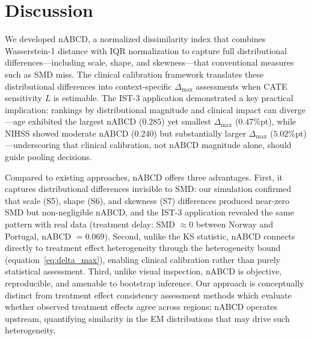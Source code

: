 \documentclass[AMA,Times1COL]{WileyNJDv5}
\begin{document}
\section{Discussion}\label{sec:discussion}

We developed nABCD, a normalized dissimilarity index that combines Wasserstein-1 distance with IQR normalization to capture full distributional differences---including scale, shape, and skewness---that conventional measures such as SMD miss. The clinical calibration framework translates these distributional differences into context-specific $\Delta_{\max}$ assessments when CATE sensitivity $L$ is estimable. The IST-3 application demonstrated a key practical implication: rankings by distributional magnitude and clinical impact can diverge---age exhibited the largest nABCD ($0.285$) yet smallest $\Delta_{\max}$ ($0.47$\%pt), while NIHSS showed moderate nABCD ($0.240$) but substantially larger $\Delta_{\max}$ ($5.02$\%pt)---underscoring that clinical calibration, not nABCD magnitude alone, should guide pooling decisions.

Compared to existing approaches, nABCD offers three advantages. First, it captures distributional differences invisible to SMD: our simulation confirmed that scale (S5), shape (S6), and skewness (S7) differences produced near-zero SMD but non-negligible nABCD, and the IST-3 application revealed the same pattern with real data (treatment delay: SMD $\approx 0$ between Norway and Portugal, nABCD $= 0.069$). Second, unlike the KS statistic, nABCD connects directly to treatment effect heterogeneity through the heterogeneity bound (equation~\ref{eq:delta_max}), enabling clinical calibration rather than purely statistical assessment. Third, unlike visual inspection, nABCD is objective, reproducible, and amenable to bootstrap inference. Our approach is conceptually distinct from treatment effect consistency assessment methods\cite{quan2010} which evaluate whether observed treatment effects agree across regions; nABCD operates upstream, quantifying similarity in the EM distributions that may drive such heterogeneity.
\end{document}
